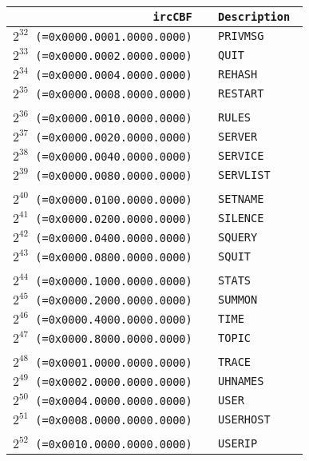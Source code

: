 \documentclass[documentation]{subfiles}
\begin{document}
\begin{minipage}{.48\textwidth}
    \small
    \begin{longtable}{>{\tt}r>{\tt}l}
        \toprule
        {\bf ircCBF} & {\bf Description} \\
        \midrule\endhead%
        $2^{32}$ (=0x0000.0001.0000.0000) & PRIVMSG      \\
        $2^{33}$ (=0x0000.0002.0000.0000) & QUIT         \\
        $2^{34}$ (=0x0000.0004.0000.0000) & REHASH       \\
        $2^{35}$ (=0x0000.0008.0000.0000) & RESTART      \\
        \\
        $2^{36}$ (=0x0000.0010.0000.0000) & RULES        \\
        $2^{37}$ (=0x0000.0020.0000.0000) & SERVER       \\
        $2^{38}$ (=0x0000.0040.0000.0000) & SERVICE      \\
        $2^{39}$ (=0x0000.0080.0000.0000) & SERVLIST     \\
        \\
        $2^{40}$ (=0x0000.0100.0000.0000) & SETNAME      \\
        $2^{41}$ (=0x0000.0200.0000.0000) & SILENCE      \\
        $2^{42}$ (=0x0000.0400.0000.0000) & SQUERY       \\
        $2^{43}$ (=0x0000.0800.0000.0000) & SQUIT        \\
        \\
        $2^{44}$ (=0x0000.1000.0000.0000) & STATS        \\
        $2^{45}$ (=0x0000.2000.0000.0000) & SUMMON       \\
        $2^{46}$ (=0x0000.4000.0000.0000) & TIME         \\
        $2^{47}$ (=0x0000.8000.0000.0000) & TOPIC        \\
        \\
        $2^{48}$ (=0x0001.0000.0000.0000) & TRACE        \\
        $2^{49}$ (=0x0002.0000.0000.0000) & UHNAMES      \\
        $2^{50}$ (=0x0004.0000.0000.0000) & USER         \\
        $2^{51}$ (=0x0008.0000.0000.0000) & USERHOST     \\
        \\
        $2^{52}$ (=0x0010.0000.0000.0000) & USERIP       \\

\end{longtable}
\end{minipage}
\end{document}
